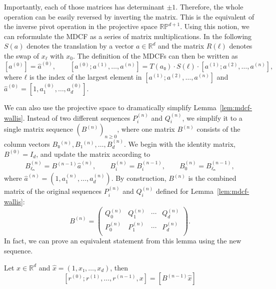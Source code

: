 Importantly, each of those matrices has
determinant $±1$.
Therefore, the whole operation can be easily reversed by inverting the matrix.
This is the equivalent of the inverse pivot operation in
the projective space $\mathbb{RP}^{d+1}$.
Using this notion, we can reformulate the MDCF as a series of matrix multiplications.
In the following $S(a)$ denotes the translation by a vector $a ∈ ℝ^d$
and the matrix $R(ℓ)$ denotes the swap of $x_ℓ$ with $x_0$.
The definition of the MDCFs can then be written as
\[
  [a^{(0)}] = \hat a^{(0)}, \qquad
  [a^{(0)}; a^{(1)}, …, a^{(n)}] = T(a₀) · S(ℓ) · [a^{(1)}; a^{(2)}, …, a^{(n)}],
\]
where $ℓ$ is the index of the largest element in $[a^{(1)}; a^{(2)}, …, a^{(n)}]$ and $\hat a^{(0)} = [1, a_1^{(0)}, …, a_d^{(0)}]$.

We can also use the projective space to dramatically simplify Lemma~\ref{lem:mdcf-wallis}.
Instead of two different sequences $P_i^{(n)}$ and $Q_i^{(n)}$, we simplify it to a single matrix sequence $(B^{(n)})_{n ≥ 0}$,
where one matrix $B^{(n)}$ consists of the column vectors $B₀^{(n)}, B₁^{(n)}, …, B_d^{(n)}$.
We begin with the identity matrix, $B^{(0)} = I_d$, and update the matrix according to
\begin{align*}
  B_{ℓₙ}^{(n)} = B^{(n-1)} \hat a^{(n)},
  \qquad B_i^{(n)} = B_i^{(n-1)},
  \qquad B_0^{(n)} = B_{ℓₙ}^{(n-1)},
\end{align*}
where $\hat a^{(n)} = (1, a_1^{(n)}, …, a_d^{(n)})$.
By construction, $B^{(n)}$ is the combined matrix of the original sequences
$P_i^{(n)}$ and $Q_i^{(n)}$ defined for Lemma~\vref{lem:mdcf-wallis}:
\[
  B^{(n)} = \begin{pmatrix}
    Q_0^{(n)} & Q_1^{(n)} & ⋯ & Q_d^{(n)} \\
    P_0^{(n)} & P_1^{(n)} & ⋯ & P_d^{(n)} \\
  \end{pmatrix}.
\]
In fact, we can prove an equivalent statement from this lemma using the new sequence.

\begin{lemma}
  \label{lem:mdcf-wallis'}
  Let $x ∈ ℝ^d$ and $\hat x = (1, x₁, …, x_d)$, then
  \[
    [r^{(0)}; r^{(1)}, …, r^{(n-1)}, x] = [B^{(n-1)} \hat x]
  \]
\end{lemma}

